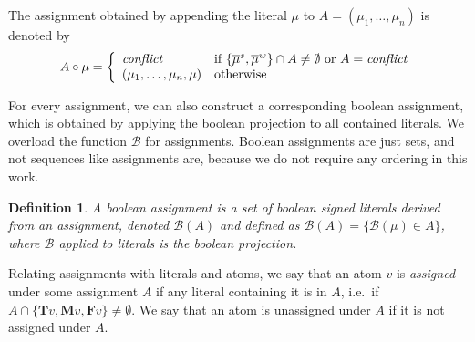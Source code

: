 \documentclass{vutinfth} %
\newtheorem{definition}{Definition}[chapter]
\newcommand{\negstrong}[1]{\overline{#1}^s}
\newcommand{\negweak}[1]{\overline{#1}^w}
\newcommand{\bass}{\mathcal{B}}
\newcommand{\ass}{A}
\newcommand{\bT}{\mathbf{T}}
\newcommand{\bM}{\mathbf{M}}
\newcommand{\bF}{\mathbf{F}}
\newcommand{\sgl}{\mu}
\begin{document}
The assignment obtained by appending the literal $\sgl$ to $\ass = (\sgl_1, \ldots, \sgl_n)$ is denoted by $$\ass \circ \sgl = \left\{\begin{array}{ll}
        
        \emph{conflict} & \text{if } \{ \negstrong{\sgl}, \negweak{\sgl} \} \cap \ass \not = \emptyset \text{ or } \ass = \emph{conflict}\\
        (\sgl_1, \ldots, \sgl_{n}, \sgl) & \text{otherwise} \\
        \end{array}\right.$$



For every assignment, we can also construct a corresponding boolean assignment, which is obtained by applying the boolean projection to all contained literals. We overload the function $\bass$ for assignments. Boolean assignments are just sets, and not sequences like assignments are, because we do not require any ordering in this work.

\begin{definition}
A \emph{boolean assignment} is a set of boolean signed literals derived from an assignment, denoted $\bass(\ass)$ and defined as $\bass(\ass) = \{ \bass(\sgl) \in \ass \}$, where $\bass$ applied to literals is the boolean projection.
\end{definition}

Relating assignments with literals and atoms, we say that an atom $v$ is \emph{assigned} under some assignment $\ass$ if any literal containing it is in $\ass$, i.e.~if $\ass \cap \{\bT v, \bM v, \bF v \} \not = \emptyset$. We say that an atom is unassigned under $A$ if it is not assigned under $A$.

\end{document}
